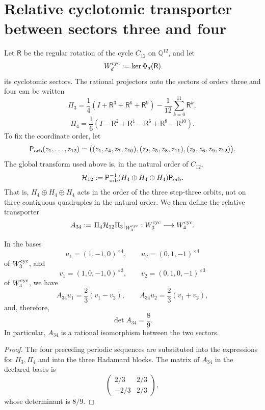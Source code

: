 \section{Relative cyclotomic transporter between sectors three and four}
\label{sec:transportador-ciclotomico-a34-rev8}

Let \(\mathsf R\) be the regular rotation of the cycle \(C_{12}\) on
\(\mathbb Q^{12}\), and let
\[
 W_d^{\rm cyc}:=\ker\Phi_d(\mathsf R)
\]
its cyclotomic sectors. The rational projectors onto the sectors of
orders three and four can be written
\[
 \Pi_3=
 \frac14(I+\mathsf R^3+\mathsf R^6+\mathsf R^9)
 -\frac1{12}\sum_{k=0}^{11}\mathsf R^k,
\]
\[
 \Pi_4=
 \frac16(I-\mathsf R^2+\mathsf R^4-\mathsf R^6
              +\mathsf R^8-\mathsf R^{10}).
\]
To fix the coordinate order, let
\[
 \mathsf P_{\rm orb}(z_1,\ldots,z_{12})
 =\bigl((z_1,z_4,z_7,z_{10}),
        (z_2,z_5,z_8,z_{11}),
        (z_3,z_6,z_9,z_{12})\bigr).
\]
The global transform used above is, in the natural order of \(C_{12}\),
\[
 \mathcal H_{12}
 :=\mathsf P_{\rm orb}^{-1}
   (H_4\oplus H_4\oplus H_4)\mathsf P_{\rm orb}.
\]
That is, \(H_4\oplus H_4\oplus H_4\) acts in the order of the three
step-three orbits, not on three contiguous quadruples in the natural order.
We then define the relative transporter
\[
 A_{34}:=\left.\Pi_4\mathcal H_{12}\Pi_3
          \right|_{W_3^{\rm cyc}}:
 W_3^{\rm cyc}\longrightarrow W_4^{\rm cyc}.
\]

\begin{theorem}
\label{thm:transportador-ciclotomico-a34-rev8}
In the bases
\[
 u_1=(1,-1,0)^{\times4},\qquad
 u_2=(0,1,-1)^{\times4}
\]
of \(W_3^{\rm cyc}\), and
\[
 v_1=(1,0,-1,0)^{\times3},\qquad
 v_2=(0,1,0,-1)^{\times3}
\]
of \(W_4^{\rm cyc}\), we have
\[
 A_{34}u_1=\frac23(v_1-v_2),\qquad
 A_{34}u_2=\frac23(v_1+v_2),
\]
and, therefore,
\[
 \boxed{\det A_{34}=\frac89}.
\]
In particular, \(A_{34}\) is a rational isomorphism between the two sectors.
\end{theorem}

\begin{proof}
The four preceding periodic sequences are substituted into the expressions
for \(\Pi_3,\Pi_4\) and into the three Hadamard blocks. The matrix of \(A_{34}\)
in the declared bases is
\[
 \begin{pmatrix}
  2/3&2/3\\
 -2/3&2/3
 \end{pmatrix},
\]
whose determinant is \(8/9\).
\end{proof}

